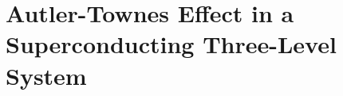 \section{Autler-Townes Effect in a Superconducting Three-Level System \cite{PhysRevLett..193601}\label{sec:autlerEffectThreeLevelSystem}}
%
% 
% 
% 
